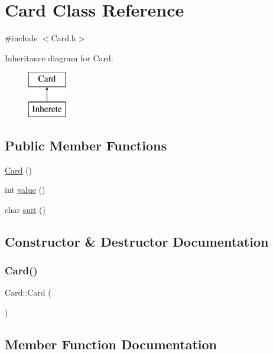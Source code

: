 \hypertarget{class_card}{}\section{Card Class Reference}
\label{class_card}


{\ttfamily \#include $<$Card.\+h$>$}

Inheritance diagram for Card\+:\begin{figure}[H]
\begin{center}
\leavevmode
\includegraphics[height=2.000000cm]{class_card}
\end{center}
\end{figure}
\subsection*{Public Member Functions}
\begin{DoxyCompactItemize}
\item 
\hyperlink{class_card_a783f5854cbe8c183ee3d4414c01472c0}{Card} ()
\item 
int \hyperlink{class_card_ab8abc1fb7afe26a4f5be4ae5ce08e936}{value} ()
\item 
char \hyperlink{class_card_a7bbc5f0f0b73077d6f9764f66c6d765a}{suit} ()
\end{DoxyCompactItemize}


\subsection{Constructor \& Destructor Documentation}
\hypertarget{class_card_a783f5854cbe8c183ee3d4414c01472c0}{}\label{class_card_a783f5854cbe8c183ee3d4414c01472c0} 
\subsubsection{\texorpdfstring{Card()}{Card()}}
{\footnotesize\ttfamily Card\+::\+Card (\begin{DoxyParamCaption}{ }\end{DoxyParamCaption})}



\subsection{Member Function Documentation}
\hypertarget{class_card_a7bbc5f0f0b73077d6f9764f66c6d765a}{}\label{class_card_a7bbc5f0f0b73077d6f9764f66c6d765a} 

